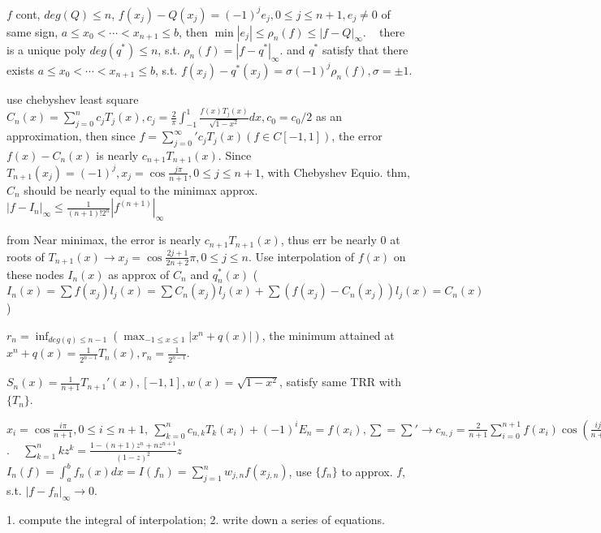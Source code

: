   $f$ cont, $deg(Q)\le n$, $f(x_j)-Q(x_j) = (-1)^je_j, 0\le j\le n+1, e_j\ne 0 $ of same sign, $a\le x_0 <\cdots < x_{n+1}\le b $, then $\min|e_j| \le \rho_n(f) \le |f-Q|_\infty $. ~ there is a unique poly $deg(q^*)\le n $, s.t. $\rho_n(f) = |f-q^*|_\infty $. and $q^* $ satisfy that there exists $a\le x_0 <\cdots < x_{n+1}\le b $, s.t. $f(x_j)-q^*(x_j) = \sigma(-1)^j\rho_n(f), \sigma = \pm 1 $.

 use chebyshev least square $C_n(x) = \sum_{j=0}^{n}c_jT_j(x), c_j = \frac{2}{\pi}\int_{-1}^{1}\frac{f(x)T_j(x)}{\sqrt{1-x^2}}dx, c_0 = c_0/2 $ as an approximation, then since $f = \sum_{j=0}^{\infty}'c_jT_j(x) (f\in C[-1, 1])$, the error $f(x) - C_n(x) $ is nearly $c_{n+1}T_{n+1}(x)$. Since $T_{n+1}(x_j) = (-1)^j, x_j = \cos\frac{j\pi}{n+1}, 0\le j\le n+1 $, with Chebyshev Equio. thm, $C_n $ should be nearly equal to the minimax approx. ~$|f-I_n|_\infty \le\frac{1}{(n+1)!2^n}|f^{(n+1)}|_\infty $

 from Near minimax, the error is nearly $c_{n+1}T_{n+1}(x) $, thus err be nearly $0$ at roots of $T_{n+1}(x) \to x_j = \cos\frac{2j+1}{2n+2}\pi, 0\le j\le n $. Use interpolation of $f(x)$ on these nodes $I_n(x) $ as approx of $C_n $ and $q_n^*(x) $ ($I_n(x) = \sum f(x_j)l_j(x) = \sum C_n(x_j)l_j(x) + \sum (f(x_j)-C_n(x_j))l_j(x) = C_n(x) $)

 $r_n = \inf_{deg(q)\le n-1}(\max_{-1\le x\le 1}|x^n+q(x)|) $, the minimum attained at $x^n+q(x) = \frac{1}{2^{n-1}}T_n(x), r_n = \frac{1}{2^{n-1}} $.

 $S_n(x) = \frac{1}{n+1}T_{n+1}'(x), [-1, 1], w(x) = \sqrt{1-x^2} $, satisfy same TRR with $\{T_n\}$.

 $x_i = \cos\frac{i\pi}{n+1}, 0\le i\le n+1, ~\sum_{k=0}^{n}c_{n,k}T_k(x_i)+(-1)^iE_n =f(x_i), \sum = \sum' \to c_{n, j} = \frac{2}{n+1}\sum_{i=0}^{n+1}f(x_i)\cos(\frac{ij\pi}{n+1}), \sum = \sum'', E_n = \frac{1}{n+1}\sum_{i=0}^{n+1}(-1)^if(x_i), \sum = \sum'' $. ~ $\sum_{k=1}^{n}kz^k = \frac{1-(n+1)z^n+nz^{n+1}}{(1-z)^2}z $ \\[5pt]

 $I_n(f) = \int_{a}^{b}f_n(x)dx = I(f_n) = \sum_{j=1}^{n}w_{j, n}f(x_{j, n}) $, use $\{f_n\}$ to approx. $f$, s.t. $|f-f_n|_\infty\to 0 $. 

 1. compute the integral of interpolation; 2. write down a series of equations.

